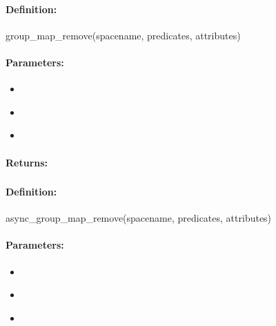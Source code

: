 \paragraph{Definition:}
\begin{rubycode}
group_map_remove(spacename, predicates, attributes)
\end{rubycode}

\paragraph{Parameters:}
\begin{itemize}[noitemsep]
\item {}\\

\item {}\\

\item {}\\

\end{itemize}

\paragraph{Returns:}


\pagebreak
\subsubsection{}
\label{api:ruby:async_group_map_remove}


\paragraph{Definition:}
\begin{rubycode}
async_group_map_remove(spacename, predicates, attributes)
\end{rubycode}

\paragraph{Parameters:}
\begin{itemize}[noitemsep]
\item {}\\

\item {}\\

\item {}\\

\end{itemize}


